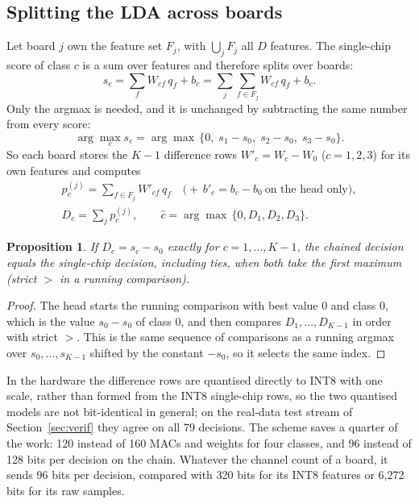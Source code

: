 \documentclass[11pt,a4paper]{article}
\newtheorem{proposition}{Proposition}
\begin{document}
\subsection{Splitting the LDA across boards}\label{sec:split}
Let board $j$ own the feature set $F_j$, with $\bigcup_j F_j$ all $D$ features. The single-chip score of class
$c$ is a sum over features and therefore splits over boards:
\begin{equation}
s_c=\sum_{f}W_{cf}\,q_f+b_c=\sum_j\sum_{f\in F_j}W_{cf}\,q_f+b_c .
\end{equation}
Only the argmax is needed, and it is unchanged by subtracting the same number from every score:
\begin{equation}
\arg\max_c s_c=\arg\max\,\{0,\;s_1-s_0,\;s_2-s_0,\;s_3-s_0\}.
\end{equation}
So each board stores the $K-1$ difference rows $W'_c=W_c-W_0$ ($c=1,2,3$) for its own features and computes
\begin{gather}
p_c^{(j)}=\sum_{f\in F_j}W'_{cf}\,q_f\quad\big(+\,b'_c=b_c-b_0\ \text{on the head only}\big),\\
D_c=\sum_j p_c^{(j)},\qquad \hat c=\arg\max\,\{0,D_1,D_2,D_3\}.
\end{gather}
\begin{proposition}
If $D_c=s_c-s_0$ exactly for $c=1,\dots,K-1$, the chained decision equals the single-chip decision, including
ties, when both take the first maximum (strict $>$ in a running comparison).
\end{proposition}
\begin{proof}
The head starts the running comparison with best value $0$ and class $0$, which is the value $s_0-s_0$ of class
0, and then compares $D_1,\dots,D_{K-1}$ in order with strict $>$. This is the same sequence of comparisons as a
running argmax over $s_0,\dots,s_{K-1}$ shifted by the constant $-s_0$, so it selects the same index.
\end{proof}
In the hardware the difference rows are quantised directly to INT8 with one scale, rather than formed from the
INT8 single-chip rows, so the two quantised models are not bit-identical in general; on the real-data test stream
of Section~\ref{sec:verif} they agree on all 79 decisions. The scheme saves a quarter of the work: 120 instead of
160 MACs and weights for four classes, and 96 instead of 128 bits per decision on the chain. Whatever the channel
count of a board, it sends 96 bits per decision, compared with 320 bits for its INT8 features or 6{,}272 bits for
its raw samples.
\end{document}
